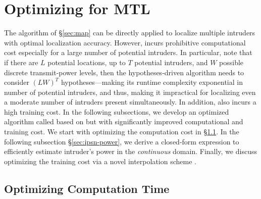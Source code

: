 \section{{\texorpdfstring{\ouralgo}: Optimizing \mll for MTL}}
\label{sec:map-time}
\label{sec:mtl}

The \map algorithm of \S\ref{sec:map} can be directly applied to
localize multiple intruders with optimal localization accuracy.
However, \map incurs prohibitive computational cost especially for a
large number of potential intruders.  In particular, note that if
there are $L$ potential locations, up to $T$ potential intruders, and
$W$ possible discrete transmit-power levels, then the
hypotheses-driven \map algorithm needs to consider $(LW)^T$
hypotheses---making its runtime complexity exponential in number of
potential intruders, and thus, making it impractical for localizing
even a moderate number of intruders present simultaneously.  In
addition, \mll also incurs a high training cost. In the following
subsections, we develop an optimized algorithm called \ouralgo based
on \map but with significantly improved computational and
training cost.
We start with optimizing the computation cost in \S\ref{sec:time}. In the following
  subsection \S\ref{sec:ipsn-power}, we derive a closed-form expression
  to efficiently estimate intruder's power in the {\em continuous}
  domain.  Finally, we discuss optimizing the training cost via a
  novel interpolation scheme \ildw.


%

\subsection{Optimizing Computation Time}
\label{sec:time}

